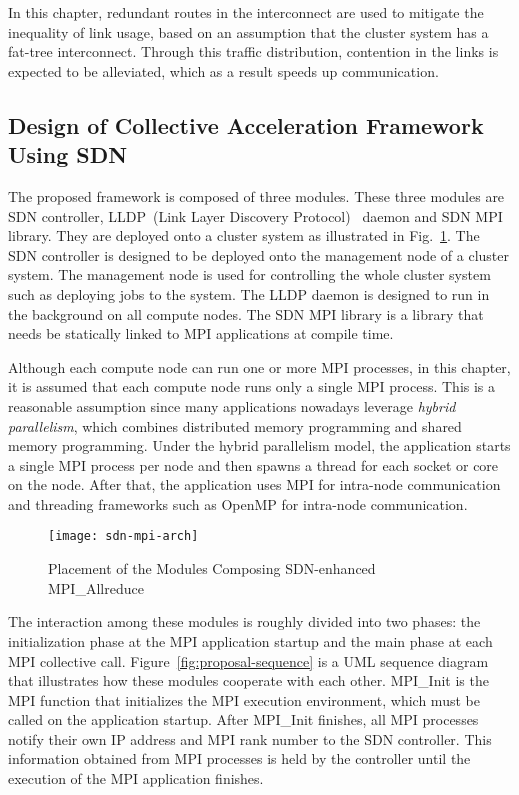 In this chapter, redundant routes in the interconnect are used to mitigate the
inequality of link usage, based on an assumption that the cluster system has a
fat-tree interconnect. Through this traffic distribution, contention in the
links is expected to be alleviated, which as a result speeds up communication.

\subsection{Design of Collective Acceleration Framework Using SDN}%
\label{sec:iii-design}

The proposed framework is composed of three modules. These three modules are
SDN controller, LLDP~(Link Layer Discovery Protocol)~\autocite{lldp} daemon
and SDN MPI library. They are deployed onto a cluster system as illustrated in
Fig.~\ref{fig:proposal-placement}. The SDN controller is designed to be
deployed onto the management node of a cluster system. The management node is
used for controlling the whole cluster system such as deploying jobs to the
system. The LLDP daemon is designed to run in the background on all compute
nodes. The SDN MPI library is a library that needs be statically linked to MPI
applications at compile time.

Although each compute node can run one or more MPI processes, in this chapter,
it is assumed that each compute node runs only a single MPI process. This is a
reasonable assumption since many applications nowadays leverage \emph{hybrid
parallelism}, which combines distributed memory programming and shared memory
programming. Under the hybrid parallelism model, the application starts a
single MPI process per node and then spawns a thread for each socket or core
on the node. After that, the application uses MPI for intra-node communication
and threading frameworks such as OpenMP for intra-node communication.

\begin{figure}
    \centering
    \texttt{[image: sdn-mpi-arch]}
    \caption{Placement of the Modules Composing SDN-enhanced MPI\_Allreduce}%
    \label{fig:proposal-placement}
\end{figure}

The interaction among these modules is roughly divided into two phases: the
initialization phase at the MPI application startup and the main phase at each
MPI collective call. Figure~\ref{fig:proposal-sequence} is a UML sequence
diagram that illustrates how these modules cooperate with each other.
MPI\_Init is the MPI function that initializes the MPI execution environment,
which must be called on the application startup. After MPI\_Init finishes, all
MPI processes notify their own IP address and MPI rank number to the SDN
controller. This information obtained from MPI processes is held by the
controller until the execution of the MPI application finishes.

